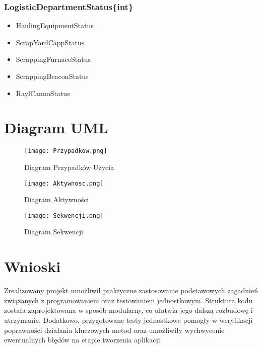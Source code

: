 \documentclass{article}
\begin{document}
\subsubsection{LogisticDepartmentStatus\{int\}}

\begin{itemize}
    \item HaulingEquipmentStatus
    \item ScrapYardCappStatus
    \item ScrappingFurnaceStatus
    \item ScrappingBeaconStatus
    \item RaylCannoStatus
\end{itemize}


\section{Diagram UML}

\begin{figure}[H]
\centering
\texttt{[image: Przypadkow.png]}
\caption{\label{fig:1} Diagram Przypadków Użycia}
\end{figure}

\begin{figure}[H]
\centering
\texttt{[image: Aktywnosc.png]}
\caption{\label{fig:2} Diagram Aktywności}
\end{figure}

\begin{figure}[H]
\centering
\texttt{[image: Sekwencji.png]}
\caption{\label{fig:1} Diagram Sekwencji}
\end{figure}

\section{Wnioski}
Zrealizowany projekt umożliwił praktyczne zastosowanie podstawowych
zagadnień związanych z programowaniem oraz testowaniem jednostkowym.
Struktura kodu została zaprojektowana w sposób modularny, co ułatwia jego dalszą rozbudowę i
utrzymanie. Dodatkowo, przygotowane testy jednostkowe pomogły w weryfikacji
poprawności działania kluczowych metod oraz umożliwiły wychwycenie ewentualnych błędów
na etapie tworzenia aplikacji.
\end{document}
